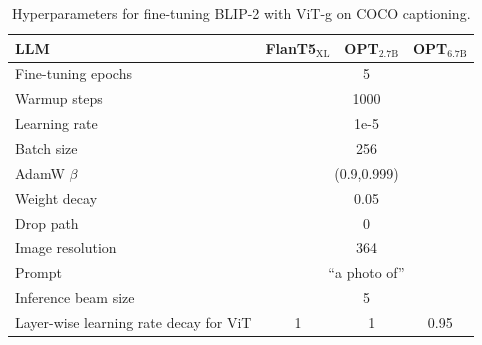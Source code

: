 \newpage
\clearpage

\appendix



\begin{table}[!t]
    \small
	\centering	
 \begin{tabular}	{l  |  c  c  c  }
        \toprule
        LLM & FlanT5$_\text{XL}$ & OPT$_\text{2.7B}$ & OPT$_\text{6.7B}$\\
        \midrule
        Fine-tuning epochs & \multicolumn{3}{c}{5}\\
        Warmup steps & \multicolumn{3}{c}{1000}\\
        Learning rate & \multicolumn{3}{c}{1e-5} \\
        Batch size & \multicolumn{3}{c}{256} \\
        AdamW $\beta$ & \multicolumn{3}{c}{(0.9,0.999)} \\
        Weight decay & \multicolumn{3}{c}{0.05}\\
        Drop path & \multicolumn{3}{c}{0}\\
        Image resolution & \multicolumn{3}{c}{364}\\
        Prompt & \multicolumn{3}{c}{``a photo of''}\\
        Inference beam size & \multicolumn{3}{c}{5}\\   
        Layer-wise learning rate decay for ViT & 1 & 1 & 0.95\\
 	\bottomrule	
	\end{tabular}

 \vspace{-1ex}
	\caption
	{
	\small	
        Hyperparameters for fine-tuning BLIP-2 with ViT-g on COCO captioning.
	}
	\vspace{-1ex}
\end{table}	


